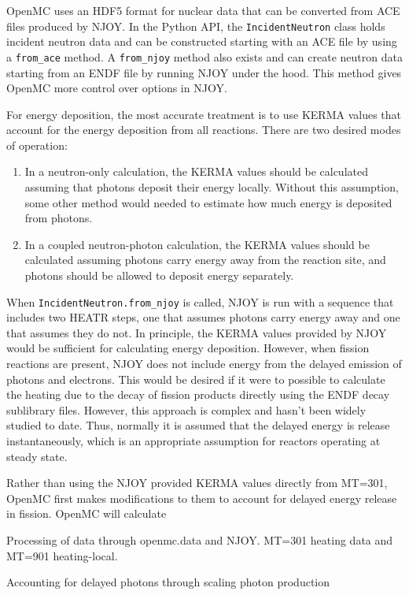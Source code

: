 \documentclass{anstrans}
\begin{document}
OpenMC uses an HDF5 format for nuclear data that can be converted from ACE files
produced by NJOY. In the Python API, the \texttt{IncidentNeutron} class holds
incident neutron data and can be constructed starting with an ACE file by using
a \texttt{from\_ace} method. A \texttt{from\_njoy} method also exists and can
create neutron data starting from an ENDF file by running NJOY under the hood.
This method gives OpenMC more control over options in NJOY.

For energy deposition, the most accurate treatment is to use KERMA values that
account for the energy deposition from all reactions. There are two
desired modes of operation:
\begin{enumerate}
    \item In a neutron-only calculation, the KERMA values should be calculated
    assuming that photons deposit their energy locally. Without this assumption,
    some other method would needed to estimate how much energy is deposited from
    photons.
    \item In a coupled neutron-photon calculation, the KERMA values should be
    calculated assuming photons carry energy away from the reaction site, and
    photons should be allowed to deposit energy separately.
\end{enumerate}
When \texttt{IncidentNeutron.from\_njoy} is called, NJOY is run with a sequence
that includes two HEATR steps, one that assumes photons carry energy away and
one that assumes they do not. In principle, the KERMA values provided by NJOY
would be sufficient for calculating energy deposition. However, when fission
reactions are present, NJOY does not include energy from the delayed emission of
photons and electrons. This would be desired if it were to possible to calculate
the heating due to the decay of fission products directly using the ENDF decay
sublibrary files. However, this approach is complex and hasn't been widely
studied to date. Thus, normally it is assumed that the delayed energy is release
instantaneously, which is an appropriate assumption for reactors operating at
steady state.

Rather than using the NJOY provided KERMA values directly from MT=301, OpenMC
first makes modifications to them to account for delayed energy release in
fission. OpenMC will calculate

Processing of data through openmc.data and NJOY. MT=301 heating data and MT=901
heating-local.

Accounting for delayed photons through scaling photon production~\cite{trumbull2013mc}
\end{document}
